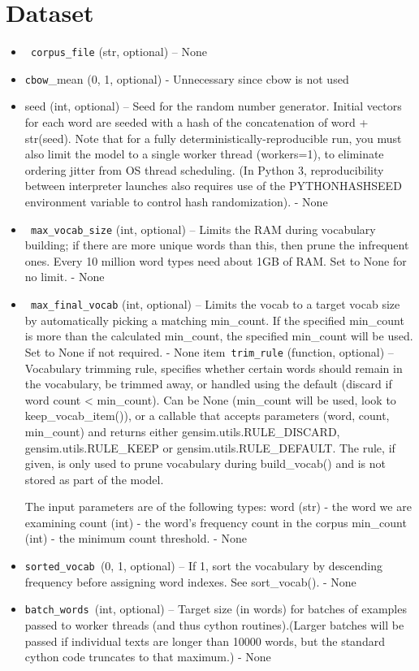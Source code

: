\chapter{Dataset}
\begin{itemize}
 \item  \texttt{ corpus\_file} (str, optional) – None
   \item \texttt{cbow}\_mean ({0, 1}, optional) - Unnecessary since cbow is not used
    \item seed (int, optional) – Seed for the random number generator. Initial vectors for each word are seeded with a hash of the concatenation of word + str(seed). Note that for a fully deterministically-reproducible run, you must also limit the model to a single worker thread (workers=1), to eliminate ordering jitter from OS thread scheduling. (In Python 3, reproducibility between interpreter launches also requires use of the PYTHONHASHSEED environment variable to control hash randomization). - None 
\item   \texttt{ max\_vocab\_size} (int, optional) – Limits the RAM during vocabulary building; if there are more unique words than this, then prune the infrequent ones. Every 10 million word types need about 1GB of RAM. Set to None for no limit. - None 
\item \texttt{   max\_final\_vocab} (int, optional) – Limits the vocab to a target vocab size by automatically picking a matching min\_count. If the specified min\_count is more than the calculated min\_count, the specified min\_count will be used. Set to None if not required. - None
item\texttt{   trim\_rule} (function, optional) –Vocabulary trimming rule, specifies whether certain words should remain in the vocabulary, be trimmed away, or handled using the default (discard if word count < min\_count). Can be None (min\_count will be used, look to keep\_vocab\_item()), or a callable that accepts parameters (word, count, min\_count) and returns either gensim.utils.RULE\_DISCARD, gensim.utils.RULE\_KEEP or gensim.utils.RULE\_DEFAULT. The rule, if given, is only used to prune vocabulary during build\_vocab() and is not stored as part of the model.

    The input parameters are of the following types:
            word (str) - the word we are examining
            count (int) - the word’s frequency count in the corpus
            min\_count (int) - the minimum count threshold. - None

  \item  \texttt{sorted\_vocab }({0, 1}, optional) – If 1, sort the vocabulary by descending frequency before assigning word indexes. See sort\_vocab(). - None
 \item   \texttt{batch\_words }(int, optional) – Target size (in words) for batches of examples passed to worker threads (and thus cython routines).(Larger batches will be passed if individual texts are longer than 10000 words, but the standard cython code truncates to that maximum.) - None 
\end{itemize}